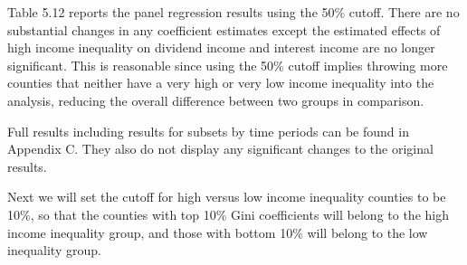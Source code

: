 \documentclass{article}
\begin{document}
Table 5.12 reports the panel regression results using the 50\% cutoff. There are no substantial changes in any coefficient estimates except the estimated effects of high income inequality on dividend income and interest income are no longer significant. This is reasonable since using the 50\% cutoff implies throwing more counties that neither have a very high or very low income inequality into the analysis, reducing the overall difference between two groups in comparison.  

Full results including results for subsets by time periods can be found in Appendix C. They also do not display any significant changes to the original results. 

\vspace{5mm}

Next we will set the cutoff for high versus low income inequality counties to be 10\%, so that the counties with top 10\% Gini coefficients will belong to the high income inequality group, and those with bottom 10\% will belong to the low inequality group.  
\end{document}
